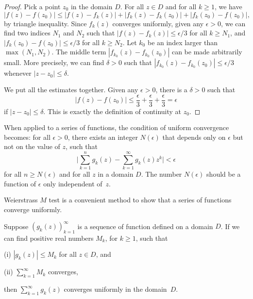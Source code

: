 \begin{proof}
	Pick a point $z_0$ in the domain $D$. For all $z\in D$ and for all $k\geq1$, we have
	$$
	|f(z) - f(z_0)| \leq 
	|f(z) - f_k(z)| + |f_k(z) - f_k(z_0)| + |f_k(z_0) - f(z_0)|,
	$$
	by triangle inequality. Since $f_k(z)$ converges uniformly, given any $\epsilon>0$, we can find two indices $N_1$ and $N_2$ such that $|f(z)-f_k(z)|\leq \epsilon /3$ for all $k\geq N_1$, and $|f_k(z_0) - f(z_0)|\leq \epsilon /3$ for all $k\geq N_2$. Let $k_0$ be an index larger than $\max(N_1,N_2)$. The middle term $|f_{k_0}(z) - f_{k_0}(z_0)|$ can be made arbitrarily small. More precisely, we can find $\delta>0$ such that $|f_{k_0}(z) - f_{k_0}(z_0)|\leq \epsilon /3$ whenever $|z-z_0|\leq \delta$.
	
	We put all the estimates together. Given any $\epsilon>0$, there is a $\delta>0$ such that
	$$
	|f(z)- f(z_0)| \leq \frac{\epsilon}{3}+\frac{\epsilon}{3}+\frac{\epsilon}{3} = \epsilon
	$$
	if $|z-z_0| \leq \delta$. This is exactly the definition of continuity at $z_0$.
\end{proof}


When applied to a series of functions, the condition of uniform convergence becomes:  for all $\epsilon >0$, there exists an integer $N(\epsilon)$ that depends only on $\epsilon$ but not on the value of $z$, such that
\begin{equation}
	\big| \sum_{k=1}^n g_k(z) - \sum_{k=1}^\infty g_k(z) z^k \big| <\epsilon
	\label{eq:uniform_convergence_power_series}
\end{equation}
for all $n \geq N(\epsilon)$ and for all $z$ in a domain $D$. The number $N(\epsilon)$ should be a function of $\epsilon$ only independent of~$z$.

%

Weierstrass $M$ test is a convenient method to show that a series of functions converge uniformly.

\begin{svgraybox}
	\begin{theorem}  \label{thm:M_test} Suppose $(g_k(z))_{k=1}^\infty$ is a sequence of  function defined on a domain $D$. If we can find positive real numbers $M_k$, for $k\geq 1$, such that
		
		(i) $|g_k(z)|\leq M_k$ for all $z\in D$, and
		
		(ii) $\sum_{k=1}^\infty M_k$ converges,
		
		then  $\sum_{k=1}^\infty g_k(z)$ converges uniformly in the domain~$D$. 
	\end{theorem}
\end{svgraybox}



